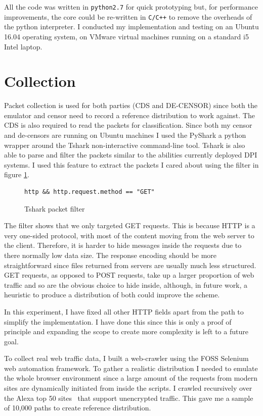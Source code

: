 \documentclass[ %
                    author={Samuel Russell},
                supervisor={Prof. Bogdan Warinschi},
                    degree={MEng},
                     title={Innocuous Ciphertexts},
                  subtitle={The DE-CENSOR Scheme},
                      type={Research},
                      year={2018} ]{dissertation}
\begin{document}
All the code was written in \texttt{python2.7} for quick prototyping but, for performance improvements, the core could be re-written in \texttt{C/C++} to remove the overheads of the python interpreter. I conducted my implementation and testing on an Ubuntu 16.04 operating system, on VMware virtual machines running on a standard i5 Intel laptop.

\section{Collection}

Packet collection is used for both parties (CDS and DE-CENSOR) since both the emulator and censor need to record a reference distribution to work against. The CDS is also required to read the packets for classification. Since both my censor and de-censors are running on Ubuntu machines I used the PyShark a python wrapper around the Tshark non-interactive command-line tool. Tshark is also able to parse and filter the packets similar to the abilities currently deployed DPI systems. I used this feature to extract the packets I cared about using the filter in figure \ref{fig:filter}.

\begin{figure}[h]
\begin{verbatim}
http && http.request.method == "GET"
\end{verbatim}
\caption{Tshark packet filter}
\label{fig:filter}
\end{figure}

The filter shows that we only targeted GET requests. This is because HTTP is a very one-sided protocol, with most of the content moving from the web server to the client.
Therefore, it is harder to hide messages inside the requests due to there normally low data size. The response encoding should be more straightforward since files returned from servers are usually much less structured. GET requests, as opposed to POST requests, take up a larger proportion of web traffic and so are the obvious choice to hide inside, although, in future work, a heuristic to produce a distribution of both could improve the scheme.

In this experiment, I have fixed all other HTTP fields apart from the path to simplify the implementation. I have done this since this is only a proof of principle and expanding the scope to create more complexity is left to a future goal.

To collect real web traffic data, I built a web-crawler using the FOSS Selenium web automation framework. To gather a realistic distribution I needed to emulate the whole browser environment since a large amount of the requests from modern sites are dynamically initiated from inside the scripts.
I crawled recursively over the Alexa top 50 sites~\cite{alexa} that support unencrypted traffic. This gave me a sample of 10,000 paths to create reference distribution.
\end{document}
